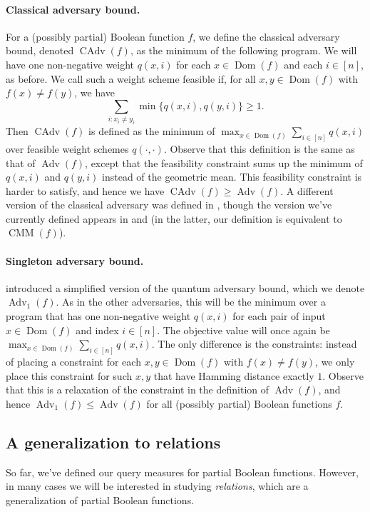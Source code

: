 \documentclass[10pt,a4paper]{article}
\theoremstyle{definition}
\DeclareMathOperator{\Dom}{Dom}
\renewcommand{\>}{\rangle}
\newcommand{\<}{\langle}
\DeclareMathOperator{\Adv}{Adv}
\DeclareMathOperator{\CAdv}{CAdv}
\begin{document}
\paragraph{Classical adversary bound.}
For a (possibly partial) Boolean function $f$,
we define the classical adversary bound,
denoted $\CAdv(f)$, as the minimum of the following
program. We will have one non-negative
weight $q(x,i)$ for each $x\in\Dom(f)$ and each $i\in[n]$,
as before. We call such a weight scheme feasible
if, for all $x,y\in\Dom(f)$ with $f(x)\ne f(y)$,
we have
\[\sum_{i:x_i\ne y_i}\min\{q(x,i),q(y,i)\}\ge 1.\]
Then $\CAdv(f)$ is defined as the minimum
of $\max_{x\in\Dom(f)}\sum_{i\in[n]} q(x,i)$
over feasible weight schemes $q(\cdot,\cdot)$.
Observe that this definition is the same as
that of $\Adv(f)$, except that the feasibility
constraint sums up the minimum of $q(x,i)$ and
$q(y,i)$ instead of the geometric mean. This feasibility
constraint is harder to satisfy, and hence we have
$\CAdv(f)\ge\Adv(f)$.
A different version of the classical adversary
was defined in \cite{Aar06}, though the version
we've currently defined appears in \cite{LM08}
and \cite{AKPV18} (in the latter, our definition
is equivalent to $\operatorname{CMM}(f)$).

\paragraph{Singleton adversary bound.}
\cite{ABK+20} introduced a simplified version
of the quantum adversary bound, which we denote
$\Adv_1(f)$. As in the other adversaries,
this will be the minimum over a program that has
one non-negative weight $q(x,i)$ for each pair
of input $x\in\Dom(f)$ and index $i\in[n]$.
The objective value will once again be
$\max_{x\in\Dom(f)}\sum_{i\in[n]} q(x,i)$.
The only difference is the constraints:
instead of placing a constraint
for each $x,y\in\Dom(f)$ with $f(x)\ne f(y)$,
we only place this constraint for such $x,y$
that have Hamming distance exactly $1$.
Observe that this is a relaxation
of the constraint in the definition of $\Adv(f)$,
and hence $\Adv_1(f)\le \Adv(f)$ for all (possibly partial)
Boolean functions $f$.

\subsection{A generalization to relations}

So far, we've defined our query measures for partial
Boolean functions. However, in many cases we will be interested
in studying \emph{relations}, which are a generalization
of partial Boolean functions.
\end{document}
